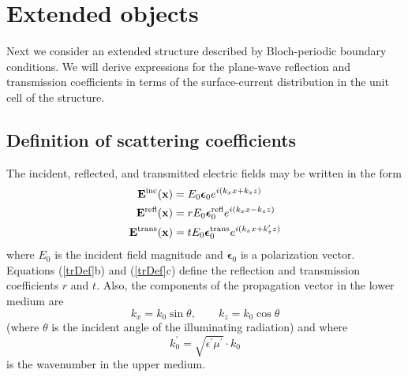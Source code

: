 \documentclass[letterpaper]{article}
\newcommand{\vbEps}{\boldsymbol{\epsilon}}
\begin{document}
\section{Extended objects}

Next we consider an extended structure described by Bloch-periodic
boundary conditions. We will derive expressions for the 
plane-wave reflection and transmission coefficients in terms
of the surface-current distribution in the unit cell of the structure.

\subsection*{Definition of scattering coefficients}

The incident, reflected, and transmitted electric fields 
may be written in the form
\begin{subequations}
\begin{align}
  \vb E\sups{inc}(\vb x)
&=E_0 \vbEps_0 e^{ i (k_x x + k_z z)}
\\
   \vb E\sups{refl}(\vb x)
&=rE_0 \vbEps_0\sups{refl} e^{ i (k_x x - k_z z)}
\\
  \vb E\sups{trans}(\vb x)
&=tE_0\vbEps_0\sups{trans} e^{ i (k_x x + k_z^\prime z)}
\end{align}
\label{trDef}
\end{subequations}
where $E_0$ is the incident field magnitude and 
$\vbEps_0$ is a polarization vector.
Equations (\ref{trDef}b) and (\ref{trDef}c)
define the reflection and transmission coefficients 
$r$ and $t$. Also, the components of the propagation
vector in the lower medium are 
$$ k_x = k_0\sin\theta, \qquad k_z=k_0\cos\theta$$
(where $\theta$ is the incident angle of the illuminating
radiation) and 
where 
$$ k_0^\prime = \sqrt{\epsilon^\prime \mu^\prime}\cdot k_0$$
is the wavenumber in the upper medium.
\end{document}
